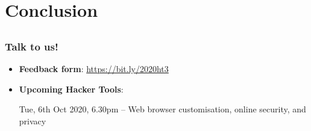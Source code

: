 \documentclass[12pt]{beamer}
\begin{document}
\section{Conclusion}
\subsection{}
\begin{frame}
  \frametitle{Talk to us!}
  \begin{itemize}
    \item \textbf{Feedback form}: \url{https://bit.ly/2020ht3}
    \item \textbf{Upcoming Hacker Tools}:

          Tue, 6th Oct 2020, 6.30pm -- Web browser customisation, online security, and privacy
  \end{itemize}
\end{frame}
\end{document}
